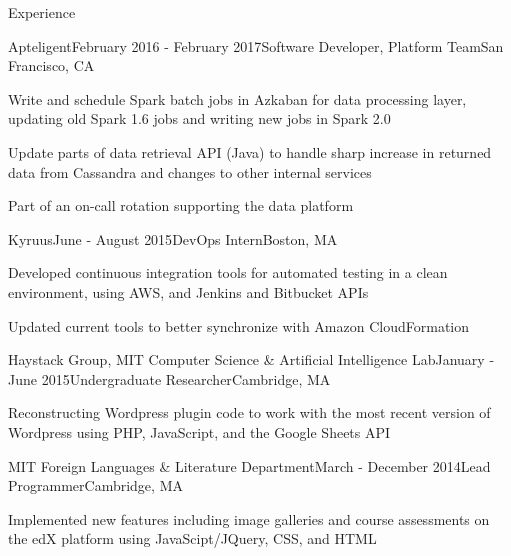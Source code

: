 \documentclass{resume} %
\begin{document}

\begin{rSection}{Experience}

\begin{rSubsection}{Apteligent}{February 2016 - February 2017}{Software Developer, Platform Team}{San Francisco, CA}
\item Write and schedule Spark batch jobs in Azkaban for data processing layer, updating old Spark 1.6 jobs and writing new jobs in Spark 2.0
\item Update parts of data retrieval API (Java) to handle sharp increase in returned data from Cassandra and changes to other internal services
\item Part of an on-call rotation supporting the data platform
\end{rSubsection}


\begin{rSubsection}{Kyruus}{June - August 2015}{DevOps Intern}{Boston, MA}
\item Developed continuous integration tools for automated testing in a clean environment, using AWS, and Jenkins and Bitbucket APIs
\item Updated current tools to better synchronize with Amazon CloudFormation
\end{rSubsection}


\begin{rSubsection}{Haystack Group, MIT Computer Science \& Artificial Intelligence Lab}{January - June 2015}{Undergraduate Researcher}{Cambridge, MA}
\item Reconstructing Wordpress plugin code to work with the most recent version of Wordpress using PHP, JavaScript, and the Google Sheets API
\end{rSubsection}


\begin{rSubsection}{MIT Foreign Languages \& Literature Department}{March - December 2014}{Lead Programmer}{Cambridge, MA}
\item Implemented new features including image galleries and course assessments on the edX platform using JavaScipt/JQuery, CSS, and HTML
\end{rSubsection}


\end{rSection}
\end{document}
